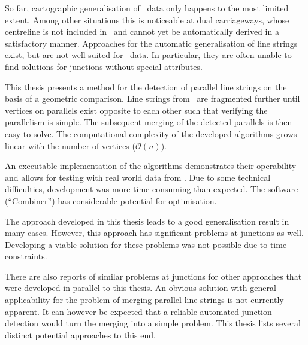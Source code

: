 \documentclass[../main/thesis.tex]{subfiles}
\begin{document}
So far, cartographic generalisation of \osm\ data only happens to the most limited extent.
Among other situations this is noticeable at dual carriageways, whose centreline is not included in \osm\ and cannot yet be automatically derived in a satisfactory manner.
Approaches for the automatic generalisation of line strings exist, but are not well suited for \osm\ data.
In particular, they are often unable to find solutions for junctions without special attributes.

This thesis presents a method for the detection of parallel line strings on the basis of a geometric comparison.
Line strings from \osm\ are fragmented further until vertices on parallels exist opposite to each other such that verifying the parallelism is simple.
The subsequent merging of the detected parallels is then easy to solve.
The computational complexity of the developed algorithms grows linear with the number of vertices ($\mathcal{O}(n)$).

An executable implementation of the algorithms demonstrates their operability and allows for testing with real world data from \osm.
Due to some technical difficulties, development was more time-consuming than expected.
The software (“Combiner”) has considerable potential for optimisation.

The approach developed in this thesis leads to a good generalisation result in many cases.
However, this approach has significant problems at junctions as well.
Developing a viable solution for these problems was not possible due to time constraints.

There are also reports of similar problems at junctions for other approaches that were developed in parallel to this thesis.
An obvious solution with general applicability for the problem of merging parallel line strings is not currently apparent.
It can however be expected that a reliable automated junction detection would turn the merging into a simple problem.
This thesis lists several distinct potential approaches to this end.
\end{document}
